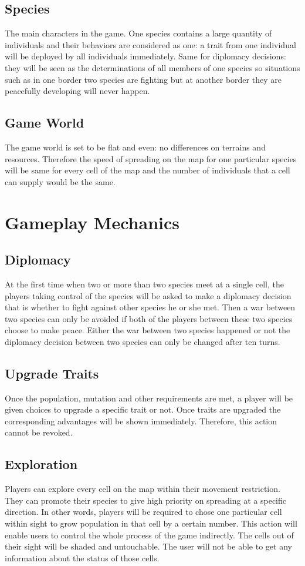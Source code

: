 \documentclass[12pt,a4paper]{article}
\begin{document}
\subsection{Species}
The main characters in the game. One species contains a large quantity of individuals and their behaviors are considered as one: a trait from one individual will be deployed by all individuals immediately. Same for diplomacy decisions: they will be seen as the determinations of all members of one species so situations such as in one border two species are fighting but at another border they are peacefully developing will never happen.

\subsection{Game World}
The game world is set to be flat and even: no differences on terrains and resources. Therefore the speed of spreading on the map for one particular species will be same for every cell of the map and the number of individuals that a cell can supply would be the same.

\section{Gameplay Mechanics}


	\subsection{Diplomacy}
	At the first time when two or more than two species meet at a single cell, the players taking control of the species will be asked to make a diplomacy decision that is whether to fight against other species he or she met. Then a war between two species can only be avoided if both of the players between these two species choose to make peace. Either the war between two species happened or not the diplomacy decision between two species can only be changed after ten turns.
	
	\subsection{Upgrade Traits}
	Once the population, mutation and other requirements are met, a player will be given choices to upgrade a specific trait or not. Once traits are upgraded the corresponding advantages will be shown immediately. Therefore, this action cannot be revoked.
	
	\subsection{Exploration}
	Players can explore every cell on the map within their movement restriction. They can promote their species to give high priority on spreading at a specific direction. In other words, players will be required to chose one particular cell within sight to grow population in that cell by a certain number. This action will enable users to control the whole process of the game indirectly. The cells out of their sight will be shaded and untouchable. The user will not be able to get any information about the status of those cells.
	
\end{document}
